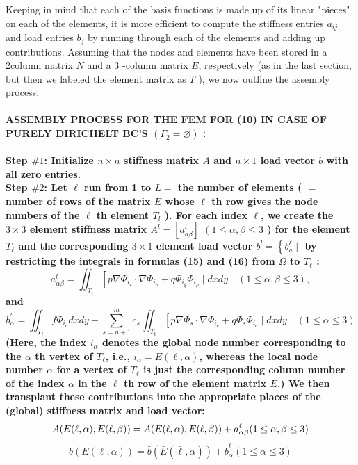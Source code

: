 \documentclass[../main.tex]{subfiles}
\begin{document}
Keeping in mind that each of the basis functions is made up of its linear "pieces" on each of the elements, it is more efficient to compute the stiffness entries $a_{i j}$ and load entries $b_{j}$ by running through each of the elements and adding up contributions. Assuming that the nodes and elements have been stored in a 2column matrix $N$ and a 3 -column matrix $E$, respectively (as in the last section, but then we labeled the element matrix as $T$ ), we now outline the assembly process:
\\
\\
\textbf{ASSEMBLY PROCESS FOR THE FEM FOR (10) IN CASE OF PURELY DIRICHELT BC'S $\left(\Gamma_{2}=\varnothing\right)$ :
\\
\\
Step $\#1$: Initialize $n \times n$ stiffness matrix $A$ and $n \times 1$ load vector $b$ with all zero entries.
\\
Step $\#2$: Let $\ell$ run from 1 to $L=$ the number of elements ( $=$ number of rows of the matrix $E$ whose $\ell$ th row gives the node numbers of the $\ell$ th element $T_{l}$ ). For each index $\ell$, we create the $3 \times 3$ element stiffness matrix $A^{l}=\left[a_{a \beta}^{l}\right]$ $\left(1 \leq \alpha, \beta \leq 3\right.$ ) for the element $T_{\ell}$ and the corresponding $3 \times 1$ element load vector $b^{l}=\left\{b_{a}^{\ell} \mid\right.$ by restricting the integrals in formulas (15) and (16) from $\Omega$ to $T_{\ell}$ :
\begin{equation}
a_{\alpha \beta}^{l}=\iint_{T_{i}}\left[p \nabla \Phi_{i_{\varepsilon}} \cdot \nabla \Phi_{i_{p}}+q \Phi_{i_{\xi}} \Phi_{i_{\rho}} \mid d x d y \quad(1 \leq \alpha, \beta \leq 3),\right.
\end{equation}
and
\begin{equation}
b_{\alpha}^{\prime}=\iint_{T_{t}} f \Phi_{i_{e}} d x d y-\sum_{s=n+1}^{m} c_{s} \iint_{T_{t}}\left[p \nabla \Phi_{s} \cdot \nabla \Phi_{i_{e}}+q \Phi_{s} \Phi_{i_{e}} \mid d x d y \quad(1 \leq \alpha \leq 3)\right.
\end{equation}
(Here, the index $i_{\alpha}$ denotes the global node number corresponding to the $\alpha$ th vertex of $T_{\ell}$, i.e., $i_{\alpha}=E(\ell, \alpha)$, whereas the local node number $\alpha$ for a vertex of $T_{\ell}$ is just the corresponding column number of the index $\alpha$ in the $\ell$ th row of the element matrix $E$.) We then transplant these contributions into the appropriate places of the (global) stiffness matrix and load vector:
\begin{equation}
A(E(\ell, \alpha), E(\ell, \beta))=A(E(\ell, \alpha), E(\ell, \beta))+a_{\alpha \beta}^{\ell}(1 \leq \alpha, \beta \leq 3) \\
\end{equation}
\begin{equation}
b(E(\ell, \alpha))=\bar{b}(\bar{E}(\bar{\ell}, \alpha))+\dot{b}_{\alpha}^{\ell}(1 \leq \alpha \leq 3)
\end{equation}}
\end{document}
